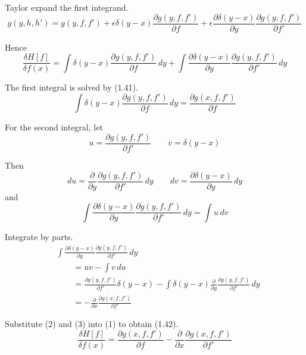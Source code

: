 \documentclass[12pt]{article}
\begin{document}
Taylor expand the first integrand.
\begin{equation*}
g(y,h,h')=g(y,f,f')
+\epsilon\delta(y-x)\frac{\partial g(y,f,f')}{\partial f}
+\epsilon\frac{\partial\delta(y-x)}{\partial y}\frac{\partial g(y,f,f')}{\partial f'}
\end{equation*}

Hence
\begin{equation*}
\frac{\delta H[f]}{\delta f(x)}
=\int\delta(y-x)\frac{\partial g(y,f,f')}{\partial f}\,dy
+\int\frac{\partial\delta(y-x)}{\partial y}\frac{\partial g(y,f,f')}{\partial f'}\,dy
\tag{1}
\end{equation*}

The first integral is solved by (1.41).
\begin{equation*}
\int\delta(y-x)\frac{\partial g(y,f,f')}{\partial f}\,dy
=\frac{\partial g(x,f,f')}{\partial f}
\tag{2}
\end{equation*}

For the second integral, let
\begin{equation*}
u=\frac{\partial g(y,f,f')}{\partial f'}
\qquad
v=\delta(y-x)
\end{equation*}

Then
\begin{equation*}
du=\frac{\partial}{\partial y}\frac{\partial g(y,f,f')}{\partial f'}\,dy
\qquad
dv=\frac{\partial\delta(y-x)}{\partial y}\,dy
\end{equation*}
and
\begin{equation*}
\int\frac{\partial\delta(y-x)}{\partial y}\frac{\partial g(y,f,f')}{\partial f'}\,dy
=\int u\,dv
\end{equation*}

Integrate by parts.
\begin{align*}
&\int\frac{\partial\delta(y-x)}{\partial y}\frac{\partial g(y,f,f')}{\partial f'}\,dy
\\
&\qquad{}=uv-\int v\,du
\\
&\qquad{}=\frac{\partial g(y,f,f')}{\partial f'}\delta(y-x)
-\int\delta(y-x)\frac{\partial}{\partial y}\frac{\partial g(y,f,f')}{\partial f'}\,dy
\\
&\qquad{}=-\frac{\partial}{\partial x}\frac{\partial g(x,f,f')}{\partial f'}
\tag{3}
\end{align*}

Substitute (2) and (3) into (1) to obtain (1.42).
\begin{equation*}
\frac{\delta H[f]}{\delta f(x)}
=\frac{\partial g(x,f,f')}{\partial f}
-\frac{\partial}{\partial x}\frac{\partial g(x,f,f')}{\partial f'}
\end{equation*}
\end{document}
